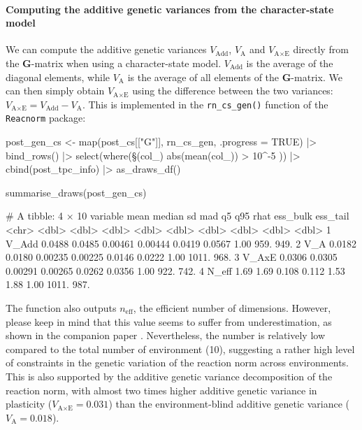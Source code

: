 \documentclass[a4paper,12pt,twoside]{article}
\begin{document}
\paragraph{Computing the additive genetic variances from the character-state model}
We can compute the additive genetic variances $V_{\text{Add}}$, $V_{\text{A}}$ and $V_{\text{A}\times\text{E}}$ directly from the $\mathbf{G}$-matrix when using a character-state model.
$V_{\text{Add}}$ is the average of the diagonal elements, while $V_{\text{A}}$ is the average of all elements of the $\mathbf{G}$-matrix.
We can then simply obtain $V_{\text{A}\times\text{E}}$ using the difference between the two variances: $V_{\text{A}\times\text{E}} = V_{\text{Add}} - V_{\text{A}}$.
This is implemented in the \texttt{rn\_cs\_gen()} function of the \texttt{Reacnorm} package:
\begin{Rinput}
post_gen_cs <-
    map(post_cs[["G"]], rn_cs_gen, .progress = TRUE) |>
    bind_rows()  |>
    select(where(\§§(col_) { abs(mean(col_)) > 10^-5 })) |>
    cbind(post_tpc_info) |>
    as_draws_df()

summarise_draws(post_gen_cs)
\end{Rinput}
\begin{Routput}
# A tibble: 4 × 10
  variable   mean median      sd     mad     q5    q95  rhat ess_bulk ess_tail
  <chr>     <dbl>  <dbl>   <dbl>   <dbl>  <dbl>  <dbl> <dbl>    <dbl>    <dbl>
1 V_Add    0.0488 0.0485 0.00461 0.00444 0.0419 0.0567  1.00     959.     949.
2 V_A      0.0182 0.0180 0.00235 0.00225 0.0146 0.0222  1.00    1011.     968.
3 V_AxE    0.0306 0.0305 0.00291 0.00265 0.0262 0.0356  1.00     922.     742.
4 N_eff    1.69   1.69   0.108   0.112   1.53   1.88    1.00    1011.     987.
\end{Routput}
The function also outputs $n_{\text{eff}}$, the efficient number of dimensions.
However, please keep in mind that this value seems to suffer from underestimation, as shown in the companion paper \autocite{devillemereuil_partitioning_2025}.
Nevertheless, the number is relatively low compared to the total number of environment (10), suggesting a rather high level of constraints in the genetic variation of the reaction norm across environments.
This is also supported by the additive genetic variance decomposition of the reaction norm, with almost two times higher additive genetic variance in plasticity ($V_{\text{A}\times\text{E}} = 0.031$) than the environment-blind additive genetic variance ($V_{\text{A}} = 0.018$).
\end{document}

